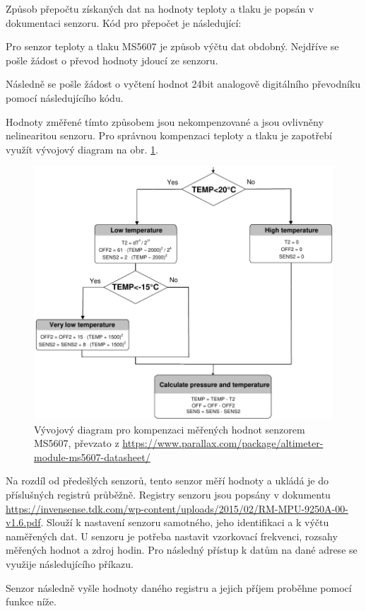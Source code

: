 \documentclass[twoside]{ctuthesis}
\theoremstyle{plain}
\theoremstyle{definition}
\theoremstyle{note}
\begin{document}
	Způsob přepočtu získaných dat na hodnoty teploty a tlaku je popsán v dokumentaci senzoru. Kód pro přepočet je následující:
	

	Pro senzor teploty a tlaku MS5607 je způsob výčtu dat obdobný. Nejdříve se pošle žádost o převod hodnoty jdoucí ze senzoru.
	
	Následně se pošle žádost o vyčtení hodnot 24bit analogově digitálního převodníku pomocí následujícího kódu.
	

	Hodnoty změřené tímto způsobem jsou nekompenzované a jsou ovlivněny nelinearitou senzoru. Pro správnou kompenzaci teploty a tlaku je zapotřebí využít vývojový diagram na obr. \ref{fig:ms5607:flowchart}.
	\begin{figure}
		\centering
		\includegraphics[width=.7\textwidth]{Figures/MS5607_flowchart.pdf}
		\caption{Vývojový diagram pro kompenzaci měřených hodnot senzorem MS5607, převzato z \url{https://www.parallax.com/package/altimeter-module-ms5607-datasheet/}}
		\label{fig:ms5607:flowchart}
	\end{figure}

	Na rozdíl od předešlých senzorů, tento senzor měří hodnoty a ukládá je do příslušných registrů průběžně. Registry senzoru jsou popsány v dokumentu \url{https://invensense.tdk.com/wp-content/uploads/2015/02/RM-MPU-9250A-00-v1.6.pdf}. Slouží k nastavení senzoru samotného, jeho identifikaci a k výčtu naměřených dat. U senzoru je potřeba nastavit vzorkovací frekvenci, rozsahy měřených hodnot a zdroj hodin. Pro následný přístup k datům na dané adrese se využije následujícího příkazu.
	
	Senzor následně vyšle hodnoty daného registru a jejich příjem proběhne pomocí funkce níže.
	
	
\end{document}
